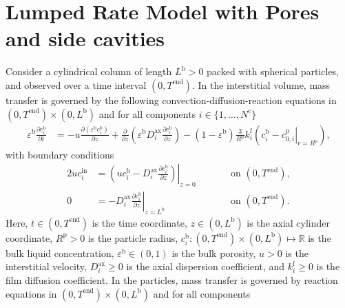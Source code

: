 \documentclass{article}
\begin{document}
\section*{Lumped Rate Model with Pores and side cavities}
Consider a cylindrical column of length $L^{\mathrm{b}} > 0$ packed with spherical particles, and observed over a time interval $(0, T^{\mathrm{end}})$.
In the interstitial volume, mass transfer is governed by the following convection-diffusion-reaction equations in $(0, T^{\mathrm{end}})\times (0, L^{\mathrm{b}})$ and for all components $i\in\{1, \dots, N^{\mathrm{c}} \}$
\begin{align}
    \varepsilon^{\mathrm{b}} \frac{\partial c^{\mathrm{b}}_{i}}{\partial t}
    &= - u \frac{\partial \left( \varepsilon^{\mathrm{b}} c^{\mathrm{b}}_{i} \right)}{\partial z}
        + \frac{\partial}{\partial z} \left( \varepsilon^{\mathrm{b}} D^{\mathrm{ax}}_{i} \frac{\partial c^{\mathrm{b}}_{i}}{\partial z} \right)
        - \left(1 - \varepsilon^{\mathrm{b}} \right) \frac{3}{R^{\mathrm{p}}} k^{\mathrm{f}}_{i} \left(c^{\mathrm{b}}_{i} - \left. c^{\mathrm{p}}_{0,i} \right|_{r = R^{\mathrm{p}}} \right),
\end{align}
with boundary conditions
\begin{alignat}{2}
    u c^{\mathrm{in}}_{i}
    &= \left.\left( u c^{\mathrm{b}}_{i} - D^{\mathrm{ax}}_{i} \frac{\partial c^{\mathrm{b}}_{i}}{\partial z}\right)\right|_{z=0}
    & & \qquad\text{on }(0, T^{\mathrm{end}}),
    \\
    0
    &= - D^{\mathrm{ax}}_{i} \left. \frac{\partial c^{\mathrm{b}}_{i}}{\partial z} \right|_{z=L^{\mathrm{b}}}
    & & \qquad\text{on }(0, T^{\mathrm{end}}).
\end{alignat}
Here, $t\in (0, T^{\mathrm{end}})$ is the time coordinate, $z\in (0, L^{\mathrm{b}})$ is the axial cylinder coordinate, $R^{\mathrm{p}}> 0$ is the particle radius, $c^{\mathrm{b}}_{i}\colon (0, T^{\mathrm{end}})\times (0, L^{\mathrm{b}}) \mapsto \mathbb{R}$ is the bulk liquid concentration, $\varepsilon^{\mathrm{b}}\in (0, 1)$ is the bulk porosity, $u> 0$ is the interstitial velocity, $D^{\mathrm{ax}}_{i}\geq 0$ is the axial dispersion coefficient, and $k^{\mathrm{f}}_{i}\geq 0$ is the film diffusion coefficient.
In the particles, mass transfer is governed by reaction equations in $(0, T^{\mathrm{end}}) \times (0, L^{\mathrm{b}})$ and for all components
\end{document}

